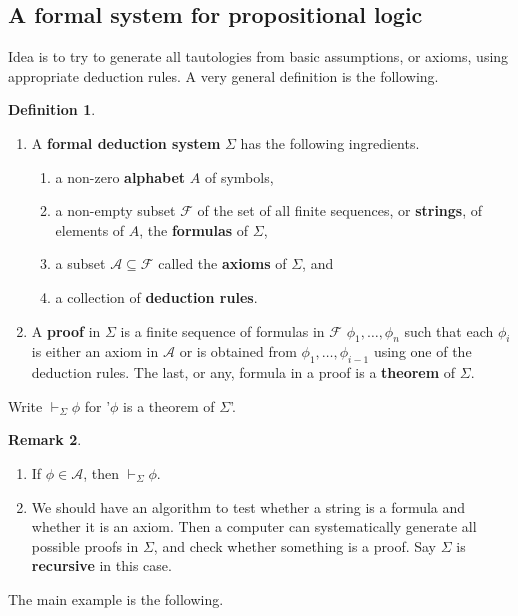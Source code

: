 \documentclass{article}
\newcommand{\A}{\mathcal{A}}
\theoremstyle{definition}\newtheorem{definition}{Definition}[subsection]
\theoremstyle{definition}\newtheorem{remark}[definition]{Remark}
\theoremstyle{definition}\newtheorem*{example}{Example}
\theoremstyle{definition}\newtheorem*{note}{Note}
\begin{document}
\subsection{A formal system for propositional logic}

Idea is to try to generate all tautologies from basic assumptions, or axioms, using appropriate deduction rules. A very general definition is the following.

\begin{definition}
\hfill
\begin{enumerate}
\item A \textbf{formal deduction system} $ \Sigma $ has the following ingredients.
\begin{enumerate}
\item a non-zero \textbf{alphabet} $ A $ of symbols,
\item a non-empty subset $ \mathcal{F} $ of the set of all finite sequences, or \textbf{strings}, of elements of $ A $, the \textbf{formulas} of $ \Sigma $,
\item a subset $ \A \subseteq \mathcal{F} $ called the \textbf{axioms} of $ \Sigma $, and
\item a collection of \textbf{deduction rules}.
\end{enumerate}
\item A \textbf{proof} in $ \Sigma $ is a finite sequence of formulas in $ \mathcal{F} $ $ \phi_1, \dots, \phi_n $ such that each $ \phi_i $ is either an axiom in $ \A $ or is obtained from $ \phi_1, \dots, \phi_{i - 1} $ using one of the deduction rules. The last, or any, formula in a proof is a \textbf{theorem} of $ \Sigma $.
\end{enumerate}
Write $ \vdash_\Sigma \phi $ for '$ \phi $ is a theorem of $ \Sigma $'.
\end{definition}

\begin{remark}
\hfill
\begin{enumerate}
\item If $ \phi \in \A $, then $ \vdash_\Sigma \phi $.
\item We should have an algorithm to test whether a string is a formula and whether it is an axiom. Then a computer can systematically generate all possible proofs in $ \Sigma $, and check whether something is a proof. Say $ \Sigma $ is \textbf{recursive} in this case.
\end{enumerate}
\end{remark}

The main example is the following.
\end{document}
